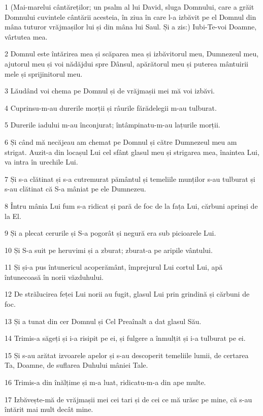 \par 1 (Mai-marelui cântăreților; un psalm al lui David, sluga Domnului, care a grăit Domnului cuvintele cântării acesteia, în ziua în care l-a izbăvit pe el Domnul din mâna tuturor vrăjmașilor lui și din mâna lui Saul. Și a zis:) Iubi-Te-voi Doamne, vârtutea mea.
\par 2 Domnul este întărirea mea și scăparea mea și izbăvitorul meu, Dumnezeul meu, ajutorul meu și voi nădăjdui spre Dânsul, apărătorul meu și puterea mântuirii mele și sprijinitorul meu.
\par 3 Lăudând voi chema pe Domnul și de vrăjmașii mei mă voi izbăvi.
\par 4 Cuprinsu-m-au durerile morții și râurile fărădelegii m-au tulburat.
\par 5 Durerile iadului m-au înconjurat; întâmpinatu-m-au lațurile morții.
\par 6 Și când mă necăjeau am chemat pe Domnul și către Dumnezeul meu am strigat. Auzit-a din locașul Lui cel sfânt glasul meu și strigarea mea, înaintea Lui, va intra în urechile Lui.
\par 7 Și s-a clătinat și s-a cutremurat pământul și temeliile munților s-au tulburat și s-au clătinat că S-a mâniat pe ele Dumnezeu.
\par 8 Întru mânia Lui fum s-a ridicat și pară de foc de la fața Lui, cărbuni aprinși de la El.
\par 9 Și a plecat cerurile și S-a pogorât și negură era sub picioarele Lui.
\par 10 Și S-a suit pe heruvimi și a zburat; zburat-a pe aripile vântului.
\par 11 Și și-a pus întunericul acoperământ, împrejurul Lui cortul Lui, apă întunecoasă în norii văzduhului.
\par 12 De strălucirea feței Lui norii au fugit, glasul Lui prin grindină și cărbuni de foc.
\par 13 Și a tunat din cer Domnul și Cel Preaînalt a dat glasul Său.
\par 14 Trimis-a săgeți și i-a risipit pe ei, și fulgere a înmulțit și i-a tulburat pe ei.
\par 15 Și s-au arătat izvoarele apelor și s-au descoperit temeliile lumii, de certarea Ta, Doamne, de suflarea Duhului mâniei Tale.
\par 16 Trimis-a din înălțime și m-a luat, ridicatu-m-a din ape multe.
\par 17 Izbăvește-mă de vrăjmașii mei cei tari și de cei ce mă urăsc pe mine, că s-au întărit mai mult decât mine.
